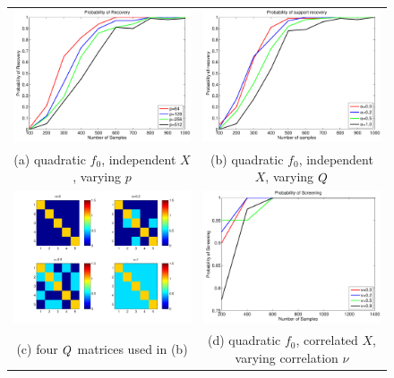 \begin{figure}[!t]
\begin{center}
\begin{tabular}{cc}
\includegraphics[width=.42\textwidth]{figs/CurveT} &
\includegraphics[width=.42\textwidth]{figs/CurveR} \\
(a) quadratic $f_0$, independent $X$, varying $p$  & (b) quadratic $f_0$, independent $X$, varying $Q$ \\
\includegraphics[width=.42\textwidth]{figs/Q} &
\includegraphics[width=.42\textwidth]{figs/CurveC}  \\
(c) four $Q$ matrices used in (b) & (d) quadratic $f_0$, correlated $X$, varying correlation $\nu$ \\

\end{tabular}
\end{center}
\end{figure}
